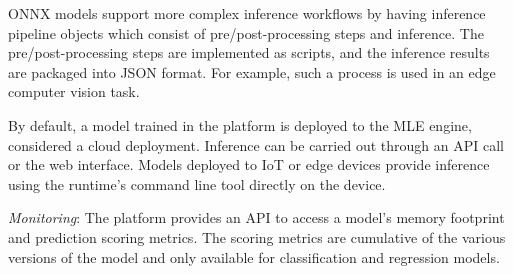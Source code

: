 ONNX models support more complex inference workflows by having inference pipeline objects which consist of pre/post-processing steps and inference. The pre/post-processing steps are implemented as scripts, and the inference results are packaged into JSON format. For example, such a process is used in an edge computer vision task.

By default, a model trained in the platform is deployed to the MLE engine, considered a cloud deployment. Inference can be carried out through an API call or the web interface. Models deployed to IoT or edge devices provide inference using the runtime’s command line tool directly on the device.


\textit{Monitoring}: The platform provides an API to access a model’s memory footprint and prediction scoring metrics. The scoring metrics are cumulative of the various versions of the model and only available for classification and regression models.